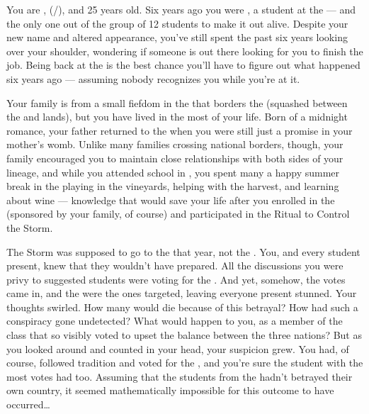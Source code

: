\documentclass[char]{GL2020}
\begin{document}
\name{\cAssistantScientist{}}

You are \cAssistantScientist{\full}, (\cAssistantScientist{\they}/\cAssistantScientist{\them}), and 25 years old. Six years ago you were \cKidScientist{\full}, a student at the \pSchool{} — and the only one out of the group of 12 students to make it out alive. Despite your new name and altered appearance, you've still spent the past six years looking over your shoulder, wondering if someone is out there looking for you to finish the job. Being back at the \pSc{} is the best chance you'll have to figure out what happened six years ago — assuming nobody recognizes you while you're at it.

Your family is from a small fiefdom in the \pFarm{} that borders the \pTech{} (squashed between the \cWildCard{\formal} and \cChupStudent{\formal} lands), but you have lived in the \pTech{} most of your life. Born of a midnight romance, your father returned to the \pTech{} when you were still just a promise in your mother's womb. Unlike many families crossing national borders, though, your family encouraged you to maintain close relationships with both sides of your lineage, and while you attended school in \pTech{}, you spent many a happy summer break in the \pFarm{} playing in the vineyards, helping with the harvest, and learning about wine — knowledge that would save your life after you enrolled in the \pSc{} (sponsored by your \pFarm{} family, of course) and participated in the Ritual to Control the Storm.

The Storm was supposed to go to the \pTech{} that year, not the \pShip{}. You, and every student present, knew that they wouldn't have prepared. All the discussions you were privy to suggested students were voting for the \pTech{}. And yet, somehow, the votes came in, and the \pShip{} were the ones targeted, leaving everyone present stunned. Your thoughts swirled. How many would die because of this betrayal? How had such a conspiracy gone undetected? What would happen to you, as a member of the class that so visibly voted to upset the balance between the three nations? But as you looked around and counted in your head, your suspicion grew. You had, of course, followed tradition and voted for the \pTech{}, and you're sure the \pFarm{} student with the most votes had too. Assuming that the students from the \pShip{} hadn't betrayed their own country, it seemed mathematically impossible for this outcome to have occurred\ldots{}
\end{document}
